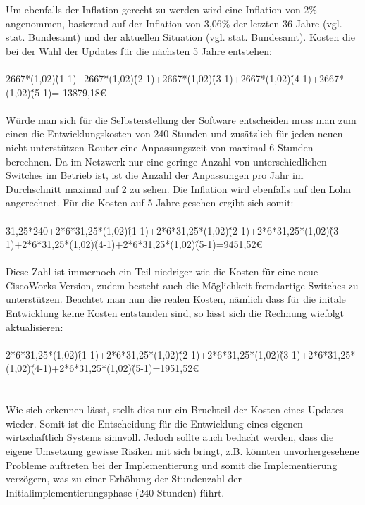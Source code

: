 Um ebenfalls der Inflation gerecht zu werden wird eine Inflation von 2\% angenommen, basierend auf der Inflation von 3,06\% der letzten 36 Jahre (vgl. stat. Bundesamt) und der aktuellen Situation (vgl. stat. Bundesamt).
Kosten die bei der Wahl der Updates für die nächsten 5 Jahre entstehen:\\
\\
2667*(1,02)\^(1-1)+2667*(1,02)\^(2-1)+2667*(1,02)\^(3-1)+2667*(1,02)\^(4-1)+2667*(1,02)\^(5-1)=
13879,18€\\
\\
Würde man sich für die Selbsterstellung der Software entscheiden muss man zum einen die Entwicklungskosten von 240 Stunden und zusätzlich für jeden neuen nicht unterstützen Router eine Anpassungszeit von maximal 6 Stunden berechnen. Da im Netzwerk nur eine geringe Anzahl von unterschiedlichen Switches im Betrieb ist, ist die Anzahl der Anpassungen pro Jahr im Durchschnitt maximal auf 2 zu sehen. Die Inflation wird ebenfalls auf den Lohn angerechnet. Für die Kosten auf 5 Jahre gesehen ergibt sich somit:\\
\\
31,25*240+2*6*31,25*(1,02)\^(1-1)+2*6*31,25*(1,02)\^(2-1)+2*6*31,25*(1,02)\^(3-1)+2*6*31,25*(1,02)\^(4-1)+2*6*31,25*(1,02)\^(5-1)=9451,52€\\
\\
Diese Zahl ist immernoch ein Teil niedriger wie die Kosten für eine neue CiscoWorks Version, zudem besteht auch die Möglichkeit fremdartige Switches zu unterstützen. Beachtet man nun die realen Kosten, nämlich dass für die initale Entwicklung keine Kosten entstanden sind, so lässt sich die Rechnung wiefolgt aktualisieren:\\
\\
2*6*31,25*(1,02)\^(1-1)+2*6*31,25*(1,02)\^(2-1)+2*6*31,25*(1,02)\^(3-1)+2*6*31,25*(1,02)\^(4-1)+2*6*31,25*(1,02)\^(5-1)=1951,52€\\
\\
\\
Wie sich erkennen lässt, stellt dies nur ein Bruchteil der Kosten eines Updates wieder.
Somit ist die Entscheidung für die Entwicklung eines eigenen wirtschaftlich Systems sinnvoll.
Jedoch sollte auch bedacht werden, dass die eigene Umsetzung gewisse Risiken mit sich bringt, z.B. könnten unvorhergesehene Probleme auftreten bei der Implementierung und somit die Implementierung verzögern, was zu einer Erhöhung der Stundenzahl der Initialimplementierungsphase (240 Stunden) führt.\\